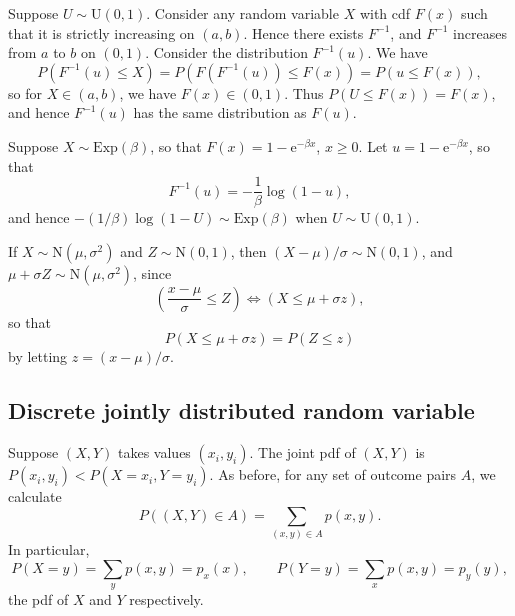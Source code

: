 \documentclass[letter-paper]{tufte-book}
\newenvironment{example}[1][Example]{\begin{trivlist}
\item[\hskip \labelsep {\bfseries #1}]}{\end{trivlist}}
\newcommand{\ex}{\mathrm{e}}
\begin{document}
\begin{example}[Example: The probability integral transform]
  Suppose $U\sim\mbox{U}(0,1)$. Consider any random variable $X$ with cdf $F(x)$
  such that it is strictly increasing on $(a,b)$. Hence there exists $F^{-1}$,
  and $F^{-1}$ increases from $a$ to $b$ on $(0,1)$. Consider the distribution
  $F^{-1}(u)$. We have
  \begin{equation*}
    P(F^{-1}(u)\leq X) = P(F(F^{-1}(u)) \leq F(x)) = P(u\leq F(x)),
  \end{equation*}
  so for $X\in(a,b)$, we have $F(x)\in(0,1)$. Thus $P(U\leq F(x)) = F(x)$, and
  hence $F^{-1}(u)$ has the same distribution as $F(u)$.
  
  Suppose $X\sim\mbox{Exp}(\beta)$, so that $F(x) = 1-\ex^{-\beta x}$, $x\geq0$.
  Let $u=1-\ex^{-\beta x}$, so that
  \begin{equation*}
    F^{-1}(u) = -\frac{1}{\beta}\log(1-u),
  \end{equation*}
  and hence $-(1/\beta)\log(1-U)\sim\mbox{Exp}(\beta)$ when
  $U\sim\mbox{U}(0,1)$.
  
  If $X\sim\mbox{N}(\mu,\sigma^2)$ and $Z\sim\mbox{N}(0,1)$, then
  $(X-\mu)/\sigma\sim\mbox{N}(0,1)$, and $\mu+\sigma
  Z\sim\mbox{N}(\mu,\sigma^2)$,
  since
  \begin{equation*}
    \left(\frac{x-\mu}{\sigma}\leq Z\right) \Leftrightarrow
    \left(X\leq \mu+\sigma z\right),
  \end{equation*}
  so that
  \begin{equation*}
    P(X\leq \mu+\sigma z) = P(Z \leq z)
  \end{equation*}
  by letting $z=(x-\mu)/\sigma$.
\end{example}


\subsection{Discrete jointly distributed random variable}

Suppose $(X,Y)$ takes values $(x_i, y_i)$. The joint pdf of $(X,Y)$ is $P(x_i,
y_i) < P(X=x_i, Y=y_i)$. As before, for any set of outcome pairs $A$, we
calculate
\begin{equation*}
  P((X,Y)\in A) = \sum_{(x,y)\in A} p(x,y).
\end{equation*}
In particular,
\begin{equation*}
  P(X=y) = \sum_y p(x,y) = p_x(x),\qquad
  P(Y=y) = \sum_x p(x,y) = p_y(y),
\end{equation*}
the pdf of $X$ and $Y$ respectively.
\end{document}
